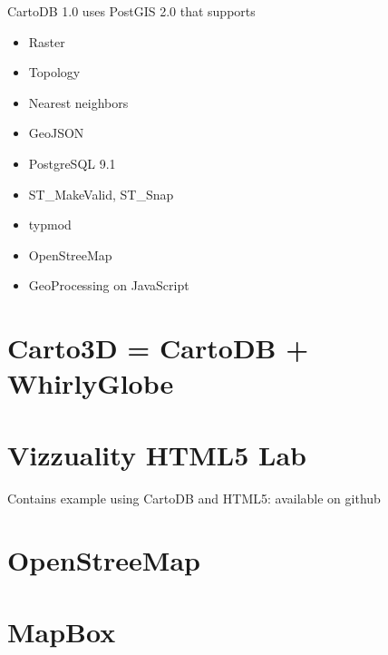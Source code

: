 CartoDB 1.0 uses PostGIS 2.0 that supports
\begin{itemize}
  \item Raster
  \item Topology
  \item Nearest neighbors
  \item GeoJSON
  \item PostgreSQL 9.1
  \item ST\_MakeValid, ST\_Snap
  \item typmod
  \item OpenStreeMap
  \item GeoProcessing on JavaScript
\end{itemize}

\section{Carto3D = CartoDB + WhirlyGlobe}


\section{Vizzuality HTML5 Lab}

Contains example using CartoDB and HTML5: available on github
\url{}

\section{OpenStreeMap}


\section{MapBox}
\label{sec:MapBox}

